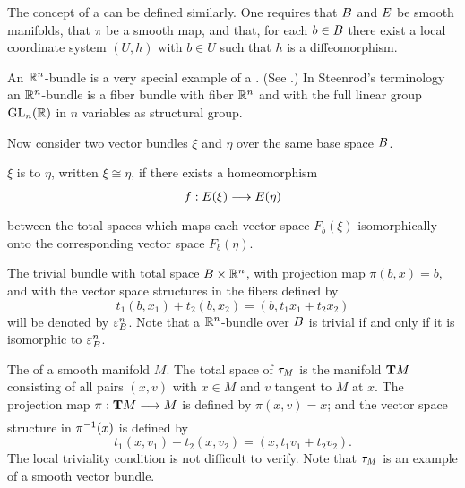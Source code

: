 \documentclass[../main]{subfiles}
\begin{document}
The concept of a  can be defined similarly. One requires that $B$ and $E$ be smooth manifolds, that $\pi$ be a smooth map, and that, for each $b\in B$ there exist a local coordinate system $(U, h)$ with $b \in U$ such that $h$ is a diffeomorphism.


\begin{remark*}
An $\mathbb R^n$-bundle is a very special example of a .
(See \cite{steenrodwhitehead1951}.) In Steenrod's terminology an $\mathbb R^n$-bundle is a
fiber bundle with fiber $\mathbb R^n$ and with the full linear group $\operatorname{GL}_n(\mathbb R)$ in $n$
variables as structural group.
\end{remark*}


Now consider two vector bundles $\xi$ and $\eta$ over the same base space $B$.


\begin{definition}\label{def:02.02}
$\xi$ is  to $\eta$, written $\xi \cong \eta$, if there exists
a homeomorphism \[f:\total(\xi)\varrightarrow{}\total(\eta)\] between the total spaces which maps each vector space $F_b(\xi)$ isomorphically onto the corresponding vector space $F_b(\eta)$.
\end{definition}


\begin{example}\label{ex:02.01}
The trivial bundle with total space $B \times \mathbb R^n$, with 
projection map $\pi(b, x) = b$, and with the vector space structures in the fibers defined by
\[t_1(b,x_1) + t_2(b,x_2) = (b,t_1x_1 + t_2x_2)\]
will be denoted by $\varepsilon^n_{B}$. Note that a $\mathbb R^n$-bundle over ${B}$ is trivial
if and only if it is isomorphic to $\varepsilon^n_{{B}}$.
\end{example}


\begin{example}\label{ex:02.02}
The 
 of a smooth manifold $M$. The
total space of $\tau_{M}$ is the manifold $\mathbf{T}M$ consisting of all pairs $(x,v)$ with
$x \in M$ and $v$ tangent to $M$ at $x$. The projection map $\pi:\tangentTS M \varrightarrow{} M$
is defined by $\pi(x, v) = x$; and the vector space structure in $\pi^{-1}(x)$ is defined by
\[t_1(x,v_1) + t_2(x,v_2) = (x,t_1v_1 + t_2v_2). \]
The local triviality condition is not difficult to verify. Note that $\tau_{M}$ is
an example of a smooth vector bundle.
\end{example}
\end{document}
